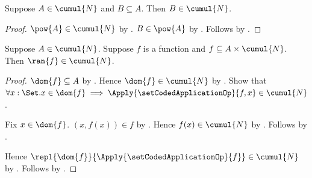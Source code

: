 \begin{proposition}\label{universe_contains_subset_of_member}
    Suppose $A\in\cumul{N}$ and $B\subseteq A$.
    Then $B\in\cumul{N}$.
\end{proposition}
\begin{proof}
    $\pow{A}\in\cumul{N}$ by .
    $B\in\pow{A}$ by .
    Follows by .
\end{proof}

\begin{theorem}\label{universe_contains_function_range}
    Suppose $A\in\cumul{N}$.
    Suppose $f$ is a function and
        $f\subseteq A\times\cumul{N}$.
    Then $\ran{f}\in\cumul{N}$.
\end{theorem}
\begin{proof}
    $\dom{f}\subseteq A$
        by .
    Hence $\dom{f}\in\cumul{N}$
        by .
    Show that
        $\forall x:\Set. x\in\dom{f}\implies
            \Apply{\setCodedApplicationOp}{f,x}
                \in\cumul{N}$.
    \begin{subproof}
        Fix $x\in\dom{f}$.
        $(x,f(x))\in f$ by .
        Hence $f(x)\in\cumul{N}$
            by .
        Follows by .
    \end{subproof}
    Hence
        $\repl{\dom{f}}{\Apply{\setCodedApplicationOp}{f}}
            \in\cumul{N}$
        by .
    Follows by .
\end{proof}
